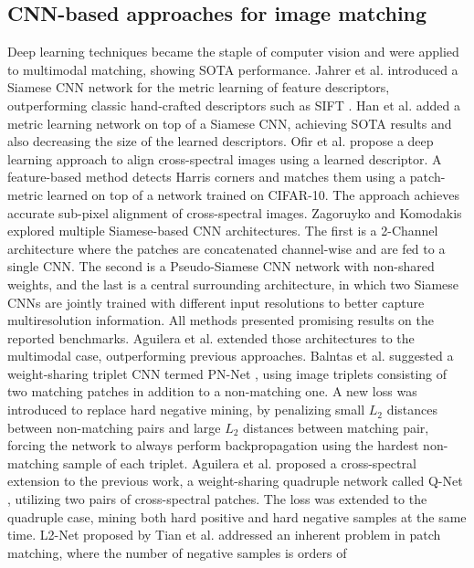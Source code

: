 \documentclass[10pt,journal]{IEEEtran}\usepackage{amsfonts}
\begin{document}
\subsection{CNN-based approaches for image matching}

Deep learning techniques became the staple of computer vision and were
applied to multimodal matching, showing SOTA performance. Jahrer et al.\cite {siamesenn} introduced a Siamese CNN network for the metric learning of
feature descriptors, outperforming classic hand-crafted descriptors such as
SIFT \cite{SIFT}. Han et al.\cite{MatchNet} added a metric learning network
on top of a Siamese CNN, achieving SOTA results and also decreasing the size
of the learned descriptors. Ofir et al. \cite{8451640} propose a deep
learning approach to align cross-spectral images using a learned descriptor.
A feature-based method detects Harris corners and matches them using a
patch-metric learned on top of a network trained on CIFAR-10. The approach
achieves accurate sub-pixel alignment of cross-spectral images. Zagoruyko
and Komodakis \cite{Zagoruyko} explored multiple Siamese-based CNN
architectures. The first is a 2-Channel architecture where the patches are
concatenated channel-wise and are fed to a single CNN. The second is a
Pseudo-Siamese CNN network with non-shared weights, and the last is a
central surrounding architecture, in which two Siamese CNNs are jointly
trained with different input resolutions to better capture multiresolution
information. All methods presented promising results on the reported
benchmarks. Aguilera et al.\cite{SiameseCrossSpectral} extended those
architectures to the multimodal case, outperforming previous approaches.
Balntas et al. suggested a weight-sharing triplet CNN termed PN-Net \cite {PN_net}, using image triplets consisting of two matching patches in
addition to a non-matching one. A new loss was introduced to replace hard
negative mining, by penalizing small $L_{2}$ distances between non-matching
pairs and large $L_{2}$ distances between matching pair, forcing the network
to always perform backpropagation using the hardest non-matching sample of
each triplet. Aguilera et al. proposed a cross-spectral extension to the
previous work, a weight-sharing quadruple network called Q-Net \cite{Q-net},
utilizing two pairs of cross-spectral patches. The loss was extended to the
quadruple case, mining both hard positive and hard negative samples at the
same time. L2-Net \cite{L2Net} proposed by Tian et al. addressed an inherent
problem in patch matching, where the number of negative samples is orders of
\end{document}
